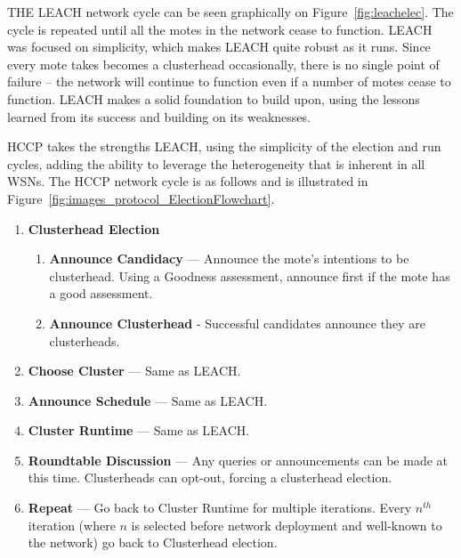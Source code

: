 THE LEACH network cycle can be seen graphically on Figure~\ref{fig:leachelec}. The cycle is repeated until all the 
motes in the network cease to function. LEACH was focused 
on simplicity, which makes LEACH quite robust as it runs. Since every mote takes becomes a clusterhead
occasionally, there is no single point of failure -- the network will continue to function even
if a number of motes cease to function. LEACH makes a solid foundation to build upon, using the 
lessons learned from its success and building on its weaknesses.


HCCP takes the strengths LEACH, using the simplicity of the election and run cycles, adding
the ability to leverage the heterogeneity that is inherent in all WSNs. The HCCP network cycle 
is as follows and is illustrated  in Figure~\ref{fig:images_protocol_ElectionFlowchart}.


\begin{enumerate}
	\item \textbf{Clusterhead Election}
	\begin{enumerate}
		\item \textbf{Announce Candidacy} --- Announce the mote's intentions to be clusterhead. 
		Using a Goodness assessment, announce first if the mote has a good assessment.
		\item \textbf{Announce Clusterhead} - Successful candidates announce they are clusterheads.
	\end{enumerate}
	\item \textbf{Choose Cluster} --- Same as LEACH.
	\item \textbf{Announce Schedule} --- Same as LEACH. 
	\item \textbf{Cluster Runtime} --- Same as LEACH.
	\item \textbf{Roundtable Discussion} --- Any queries or announcements can be made at this time. 
	Clusterheads can opt-out, forcing a clusterhead election.
	\item \textbf{Repeat} --- Go back to Cluster Runtime for multiple iterations. Every $n^{th}$ iteration 
	(where $n$ is selected before network deployment and well-known to the network) go back to Clusterhead election.
	
\end{enumerate}

